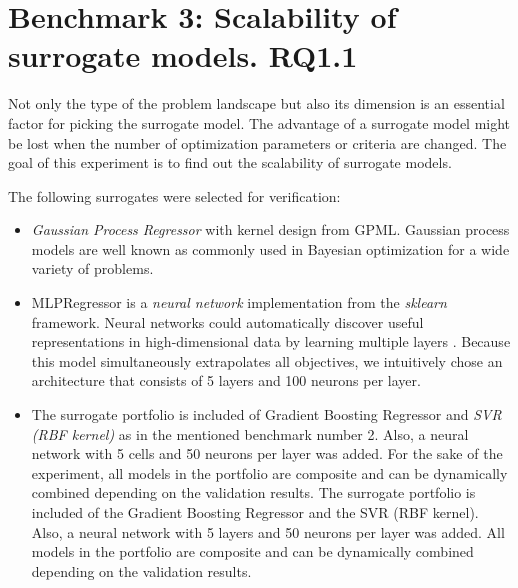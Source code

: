 \section{Benchmark 3: Scalability of surrogate models. RQ1.1}
    Not only the type of the problem landscape but also its dimension is an essential factor for picking the surrogate model. The advantage of a surrogate model might be lost when the number of optimization parameters or criteria are changed. The goal of this experiment is to find out the scalability of surrogate models. 


    The following surrogates were selected for verification:
    \begin{itemize}
        \item \emph{Gaussian Process Regressor} with kernel design from GPML\cite{RasmussenN10}. Gaussian process models are well known as commonly used in Bayesian optimization for a wide variety of problems. 
        \item MLPRegressor is a \emph{neural network} implementation from the \textit{sklearn} framework. Neural networks could automatically discover useful representations in high-dimensional data by learning multiple layers \cite{WilsonHSX16}. Because this model simultaneously extrapolates all objectives, we intuitively chose an architecture that consists of 5 layers and 100 neurons per layer.
        \item The surrogate portfolio is included of Gradient Boosting Regressor and \emph{SVR (RBF kernel)} as in the mentioned benchmark number 2. Also, a neural network with 5 cells and 50 neurons per layer was added. For the sake of the experiment, all models in the portfolio are composite and can be dynamically combined depending on the validation results. The surrogate portfolio is included of the Gradient Boosting Regressor and the SVR (RBF kernel). Also, a neural network with 5 layers and 50 neurons per layer was added. All models in the portfolio are composite and can be dynamically combined depending on the validation results.
    \end{itemize}

